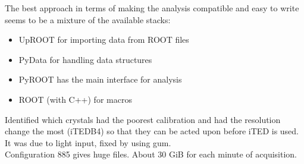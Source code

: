 \begin{minipage}[t][0.2\textheight][t]{0.97\linewidth}
    The best approach in terms of making the analysis compatible and easy to write seems to be a mixture of the available stacks:
    \begin{itemize}
      \item UpROOT for importing data from ROOT files
      \item PyData for handling data structures
      \item PyROOT has the main interface for analysis
      \item ROOT (with C++) for macros
    \end{itemize}
    Identified which crystals had the poorest calibration and had the resolution change the most (iTEDB4) so that they can be acted upon before iTED is used. It was due to light input, fixed by using gum.\\
    Configuration 885 gives huge files. About 30 GiB for each minute of acquisition.
\end{minipage}

\newpage